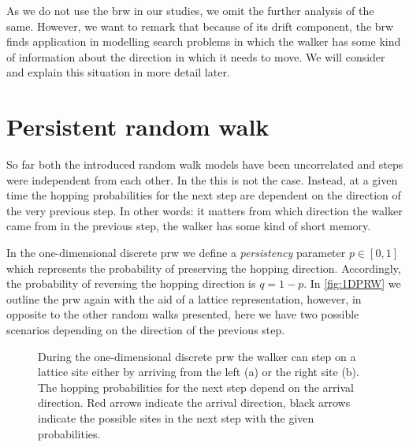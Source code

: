 As we do not use the \ac{brw} in our studies, we omit the further analysis of the same. However,  we want to remark that because of its drift component, the \ac{brw} finds application in modelling search problems in which the walker has some kind of information about the direction in which it needs to move. We will consider and explain this situation in more detail later.

\section{Persistent random walk}
So far both the introduced random walk models have been uncorrelated and steps were independent from each other. In the  this is not the case. Instead, at a given time the hopping probabilities for the next step are dependent on the direction of the very previous step. In other words: it matters from which direction the walker came from in the previous step, \ie the walker has some kind of short memory.

In the one-dimensional discrete \ac{prw} we define a \textit{persistency} parameter $p \in [0,1]$ which represents the probability of preserving the hopping direction. Accordingly, the probability of reversing the hopping direction is $q = 1 - p$. In \autoref{fig:1DPRW} we outline the \ac{prw} again with the aid of a lattice representation, however, in opposite to the other random walks presented, here we have two possible scenarios depending on the direction of the previous step.

\begin{figure}[bth]
    \myfloatalign
     \quad
    \caption[\acl{prw} on a one-dimensional lattice]{During the one-dimensional discrete \ac{prw} the walker can step on a lattice site either by arriving from the left (a) or the right site (b). The hopping probabilities for the next step depend on the arrival direction. Red arrows indicate the arrival direction, black arrows indicate the possible sites in the next step with the given probabilities.}\label{fig:1DPRW}
\end{figure}

